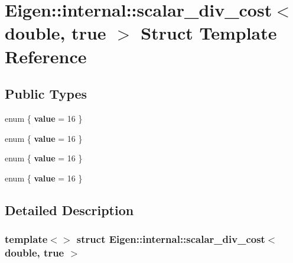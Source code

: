 \hypertarget{struct_eigen_1_1internal_1_1scalar__div__cost_3_01double_00_01true_01_4}{}\section{Eigen\+:\+:internal\+:\+:scalar\+\_\+div\+\_\+cost$<$ double, true $>$ Struct Template Reference}
\label{struct_eigen_1_1internal_1_1scalar__div__cost_3_01double_00_01true_01_4}
\subsection*{Public Types}
\begin{DoxyCompactItemize}
\item 
\mbox{\label{struct_eigen_1_1internal_1_1scalar__div__cost_3_01double_00_01true_01_4_a6df27bfbf4bec52b3697c7e4f21f1da4}} 
enum \{ {\bfseries value} = 16
 \}
\item 
\mbox{\label{struct_eigen_1_1internal_1_1scalar__div__cost_3_01double_00_01true_01_4_ae67395b0c9947440319357c304c76f7e}} 
enum \{ {\bfseries value} = 16
 \}
\item 
\mbox{\label{struct_eigen_1_1internal_1_1scalar__div__cost_3_01double_00_01true_01_4_a4452d5c4632853c079ee8e3c4c241aca}} 
enum \{ {\bfseries value} = 16
 \}
\item 
\mbox{\label{struct_eigen_1_1internal_1_1scalar__div__cost_3_01double_00_01true_01_4_abc1ae17c245c566a649bf4598b8cabb8}} 
enum \{ {\bfseries value} = 16
 \}
\end{DoxyCompactItemize}


\subsection{Detailed Description}
\subsubsection*{template$<$$>$\newline
struct Eigen\+::internal\+::scalar\+\_\+div\+\_\+cost$<$ double, true $>$}



